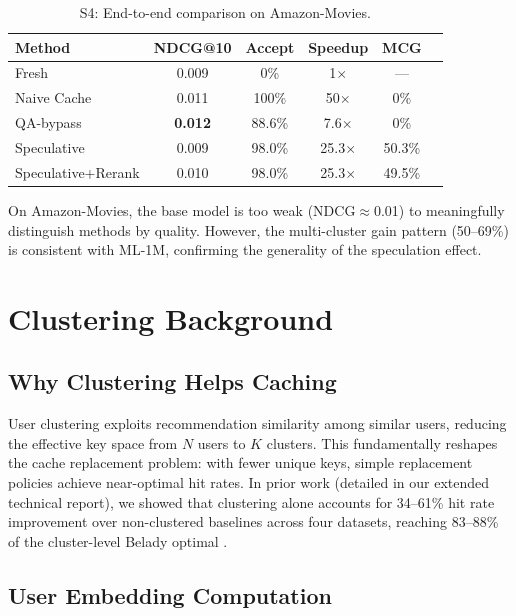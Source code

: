 \documentclass{article}
\begin{document}
\begin{table}[h]
\centering
\caption{S4: End-to-end comparison on Amazon-Movies.}
\label{tab:s4_amazon}
\small
\begin{tabular}{lccccc}
\toprule
\textbf{Method} & \textbf{NDCG@10} & \textbf{Accept} & \textbf{Speedup} & \textbf{MCG} \\
\midrule
Fresh & 0.009 & 0\% & 1$\times$ & --- \\
Naive Cache & 0.011 & 100\% & 50$\times$ & 0\% \\
QA-bypass & \textbf{0.012} & 88.6\% & 7.6$\times$ & 0\% \\
Speculative & 0.009 & 98.0\% & 25.3$\times$ & 50.3\% \\
Speculative+Rerank & 0.010 & 98.0\% & 25.3$\times$ & 49.5\% \\
\bottomrule
\end{tabular}
\end{table}

On Amazon-Movies, the base model is too weak (NDCG$\approx$0.01) to meaningfully distinguish methods by quality. However, the multi-cluster gain pattern (50--69\%) is consistent with ML-1M, confirming the generality of the speculation effect.

\section{Clustering Background}
\label{app:clustering}

\subsection{Why Clustering Helps Caching}

User clustering exploits recommendation similarity among similar users, reducing the effective key space from $N$ users to $K$ clusters. This fundamentally reshapes the cache replacement problem: with fewer unique keys, simple replacement policies achieve near-optimal hit rates. In prior work (detailed in our extended technical report), we showed that clustering alone accounts for 34--61\% hit rate improvement over non-clustered baselines across four datasets, reaching 83--88\% of the cluster-level Belady optimal \citep{belady1966}.

\subsection{User Embedding Computation}
\end{document}
